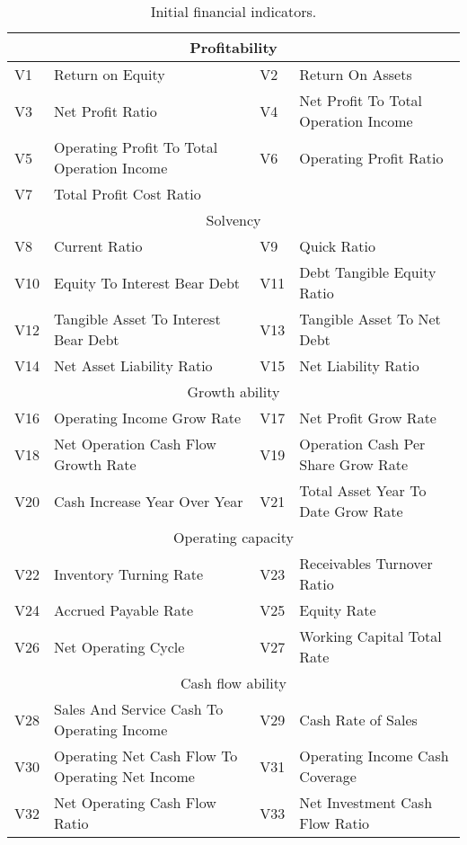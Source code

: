 \documentclass[review]{elsarticle}
\begin{document}
\begin{table}[H]\footnotesize
    \centering
    \caption{Initial financial indicators.}
    \label{table: 3}
    \begin{tabular}{llll}
    \hline
    \multicolumn{4}{c}{Profitability} \\ \hline
    V1 & Return on Equity & V2 & Return On Assets \\
    V3 & Net Profit Ratio & V4 & Net Profit To Total Operation Income \\
    V5 & Operating Profit To Total Operation Income & V6 & Operating Profit Ratio \\
    V7 & Total Profit Cost Ratio &  &  \\ \hline
    \multicolumn{4}{c}{Solvency} \\ \hline
    V8 & Current Ratio & V9 & Quick Ratio \\
    V10 & Equity To Interest Bear Debt & V11 & Debt Tangible Equity Ratio \\
    V12 & Tangible Asset To Interest Bear Debt & V13 & Tangible Asset To Net Debt \\
    V14 & Net Asset Liability Ratio & V15 & Net Liability Ratio \\ \hline
    \multicolumn{4}{c}{Growth ability} \\ \hline
    V16 & Operating Income Grow Rate & V17 & Net Profit Grow Rate \\
    V18 & Net Operation Cash Flow Growth Rate & V19 & Operation Cash Per Share Grow Rate \\
    V20 & Cash Increase Year Over Year & V21 & Total Asset Year To Date Grow Rate \\ \hline
    \multicolumn{4}{c}{Operating capacity} \\ \hline
    V22 & Inventory Turning Rate & V23 & Receivables Turnover Ratio \\
    V24 & Accrued Payable Rate & V25 & Equity Rate \\
    V26 & Net Operating Cycle & V27 & Working Capital Total Rate \\ \hline
    \multicolumn{4}{c}{Cash flow ability} \\ \hline
    V28 & Sales And Service Cash To Operating Income & V29 & Cash Rate of Sales \\
    V30 & Operating Net Cash Flow To Operating Net Income & V31 & Operating Income Cash Coverage \\
    V32 & Net Operating Cash Flow Ratio & V33 & Net Investment Cash Flow Ratio \\

\end{tabular}
\end{table}
\end{document}
